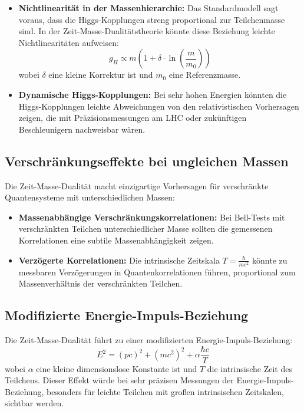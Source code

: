 \documentclass[a4paper,12pt]{article}
\begin{document}
	\begin{itemize}
		\item \textbf{Nichtlinearität in der Massenhierarchie:} Das Standardmodell sagt voraus, dass die Higgs-Kopplungen streng proportional zur Teilchenmasse sind. In der Zeit-Masse-Dualitätstheorie könnte diese Beziehung leichte Nichtlinearitäten aufweisen:
		\begin{equation}
			g_H \propto m \left(1 + \delta \cdot \ln\left(\frac{m}{m_0}\right)\right)
		\end{equation}
		wobei $\delta$ eine kleine Korrektur ist und $m_0$ eine Referenzmasse.
		
		\item \textbf{Dynamische Higgs-Kopplungen:} Bei sehr hohen Energien könnten die Higgs-Kopplungen leichte Abweichungen von den relativistischen Vorhersagen zeigen, die mit Präzisionsmessungen am LHC oder zukünftigen Beschleunigern nachweisbar wären.
	\end{itemize}
	
	\subsection{Verschränkungseffekte bei ungleichen Massen}
	
	Die Zeit-Masse-Dualität macht einzigartige Vorhersagen für verschränkte Quantensysteme mit unterschiedlichen Massen:
	
	\begin{itemize}
		\item \textbf{Massenabhängige Verschränkungskorrelationen:} Bei Bell-Tests mit verschränkten Teilchen unterschiedlicher Masse sollten die gemessenen Korrelationen eine subtile Massenabhängigkeit zeigen.
		
		\item \textbf{Verzögerte Korrelationen:} Die intrinsische Zeitskala $T = \frac{\hbar}{mc^2}$ könnte zu messbaren Verzögerungen in Quantenkorrelationen führen, proportional zum Massenverhältnis der verschränkten Teilchen.
	\end{itemize}
	
	\subsection{Modifizierte Energie-Impuls-Beziehung}
	
	Die Zeit-Masse-Dualität führt zu einer modifizierten Energie-Impuls-Beziehung:
	\begin{equation}
		E^2 = (pc)^2 + (mc^2)^2 + \alpha\frac{\hbar c}{T}
	\end{equation}
	wobei $\alpha$ eine kleine dimensionslose Konstante ist und $T$ die intrinsische Zeit des Teilchens. Dieser Effekt würde bei sehr präzisen Messungen der Energie-Impuls-Beziehung, besonders für leichte Teilchen mit großen intrinsischen Zeitskalen, sichtbar werden.
	
\end{document}
